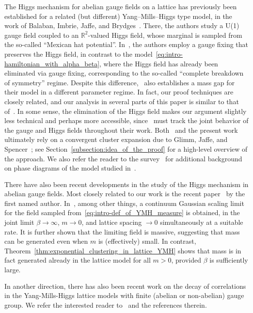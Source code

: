 \documentclass[11pt]{article}
\theoremstyle{definition}
\theoremstyle{remark}
\numberwithin{theorem}{section}
\begin{document}
    The Higgs mechanism for abelian gauge fields on a lattice has previously been established for a related (but different) Yang--Mills--Higgs type model, in the work of Balaban, Imbrie, Jaffe, and Brydges~\cite{Balaban-Imbrie-Jaffe-Brydges}. There, the authors study a U(1) gauge field coupled to an $\mathbb{R}^2$-valued Higgs field, whose marginal is sampled from the so-called ``Mexican hat potential''. In~\cite{Balaban-Imbrie-Jaffe-Brydges}, the authors employ a gauge fixing that preserves the Higgs field, in contrast to the model~\eqref{eq:intro-hamiltonian_with_alpha_beta}, where the Higgs field has already been eliminated via gauge fixing, corresponding to the so-called ``complete breakdown of symmetry'' regime. Despite this difference,~\cite{Balaban-Imbrie-Jaffe-Brydges} also establishes a mass gap for their model in a different parameter regime. In fact, our proof techniques are closely related, and our analysis in several parts of this paper is similar to that of~\cite{Balaban-Imbrie-Jaffe-Brydges}. In some sense, the elimination of the Higgs field makes our argument slightly less technical and perhaps more accessible, since~\cite{Balaban-Imbrie-Jaffe-Brydges} must track the joint behavior of the gauge and Higgs fields throughout their work. Both~\cite{Balaban-Imbrie-Jaffe-Brydges} and the present work ultimately rely on a convergent cluster expansion due to Glimm, Jaffe, and Spencer~\cite{Glimm-Jaffe-Spencer}; see Section~\ref{subsection:idea_of_the_proof} for a high-level overview of the approach. We also refer the reader to the survey~\cite{Borgs-Nill} for additional background on phase diagrams of the model studied in~\cite{Balaban-Imbrie-Jaffe-Brydges}.

    There have also been recent developments in the study of the Higgs mechanism in abelian gauge fields. Most closely related to our work is the recent paper~\cite{Chatterjee-HiggsMechanism} by the first named author. In~\cite{Chatterjee-HiggsMechanism}, among other things, a continuum Gaussian scaling limit for the field sampled from~\eqref{eq:intro-def_of_YMH_measure} is obtained, in the joint limit $\beta\to\infty$, $m\to 0$, and lattice spacing $\to 0$ simultaneously at a suitable rate. It is further shown that the limiting field is massive, suggesting that mass can be generated even when $m$ is (effectively) small. In contrast, Theorem~\ref{thm:exponential_clustering_in_lattice_YMH} shows that mass is in fact generated already in the lattice model for all $m>0$, provided $\beta$ is sufficiently large. 

    In another direction, there has also been recent work on the decay of correlations in the Yang-Mills-Higgs lattice models with finite (abelian or non-abelian) gauge group. We refer the interested reader to~\cite{Adhikari-Cao, Frosstrom, Frosstrom-Lenells-Viklund} and the references therein. 
\end{document}
